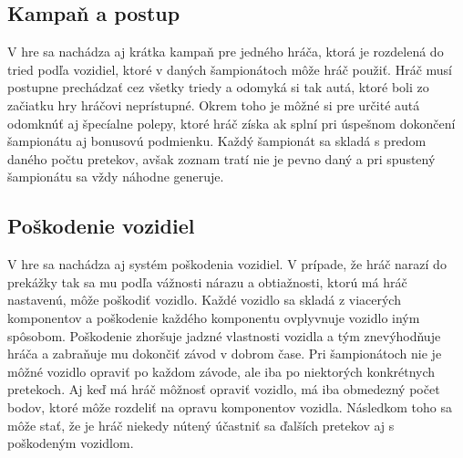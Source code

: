 \documentclass[a4paper,10pt,slovak]{article}
\begin{document}
\subsection*{Kampaň a postup}

V hre sa nachádza aj krátka kampaň pre jedného hráča, ktorá je rozdelená do tried podľa vozidiel, ktoré v daných šampionátoch môže hráč použiť. Hráč musí postupne prechádzať cez všetky triedy a odomyká si tak autá, ktoré boli zo začiatku hry hráčovi neprístupné. Okrem toho je môžné si pre určité autá odomknúť aj špecíalne polepy, ktoré hráč získa ak splní pri úspešnom dokončení šampionátu aj bonusovú podmienku. Každý šampionát sa skladá s predom daného počtu pretekov, avšak zoznam tratí nie je pevno daný a pri spustený šampionátu sa vždy náhodne generuje.

\subsection*{Poškodenie vozidiel}

V hre sa nachádza aj systém poškodenia vozidiel. V prípade, že hráč narazí do prekážky tak sa mu podľa vážnosti nárazu a obtiažnosti, ktorú má hráč nastavenú, môže poškodiť vozidlo. Každé vozidlo sa skladá z viacerých komponentov a poškodenie každého komponentu ovplyvnuje vozidlo iným spôsobom. Poškodenie zhoršuje jadzné vlastnosti vozidla a tým znevýhodňuje hráča a zabraňuje mu dokončiť závod v dobrom čase. Pri šampionátoch nie je môžné vozidlo opraviť po každom závode, ale iba po niektorých konkrétnych pretekoch. Aj keď má hráč môžnosť opraviť vozidlo, má iba obmedezný počet bodov, ktoré môže rozdeliť na opravu komponentov vozidla. Následkom toho sa môže stať, že je hráč niekedy nútený účastniť sa ďalších pretekov aj s poškodeným vozidlom.
\end{document}
